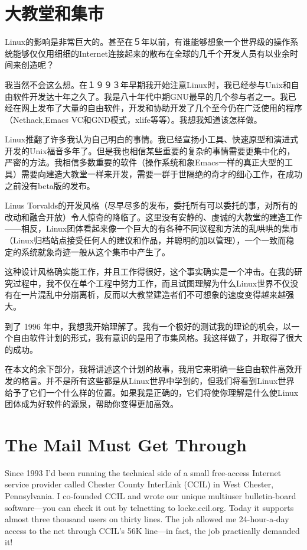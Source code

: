\documentclass[a4paper,12pt,UTF8,twoside]{ctexbook}
\begin{document}
\chapter{大教堂和集市}


Linux的影响是非常巨大的。甚至在５年以前，有谁能够想象一个世界级的操作系统能够仅仅用细细的Internet连接起来的散布在全球的几千个开发人员有以业余时间来创造呢？

我当然不会这么想。在１９９３年早期我开始注意Linux时，我已经参与Unix和自由软件开发达十年之久了。我是八十年代中期GNU最早的几个参与者之一。我已经在网上发布了大量的自由软件，开发和协助开发了几个至今仍在广泛使用的程序（Nethack,Emacs VC和GND模式，xlife等等）。我想我知道该怎样做。


Linux推翻了许多我认为自己明白的事情。我已经宣扬小工具、快速原型和演进式开发的Unix福音多年了。但是我也相信某些重要的复杂的事情需要更集中化的，严密的方法。我相信多数重要的软件（操作系统和象Emacs一样的真正大型的工具）需要向建造大教堂一样来开发，需要一群于世隔绝的奇才的细心工作，在成功之前没有beta版的发布。

Linus Torvalds的开发风格（尽早尽多的发布，委托所有可以委托的事，对所有的改动和融合开放）令人惊奇的降临了。这里没有安静的、虔诚的大教堂的建造工作——相反，Linux团体看起来像一个巨大的有各种不同议程和方法的乱哄哄的集市（Linux归档站点接受任何人的建议和作品，并聪明的加以管理），一个一致而稳定的系统就象奇迹一般从这个集市中产生了。


这种设计风格确实能工作，并且工作得很好，这个事实确实是一个冲击。在我的研究过程中，我不仅在单个工程中努力工作，而且试图理解为什么Linux世界不仅没有在一片混乱中分崩离析，反而以大教堂建造者们不可想象的速度变得越来越强大。


到了 1996 年中，我想我开始理解了。我有一个极好的测试我的理论的机会，以一个自由软件计划的形式，我有意识的是用了市集风格。我这样做了，并取得了很大的成功。


在本文的余下部分，我将讲述这个计划的故事，我用它来明确一些自由软件高效开发的格言。并不是所有这些都是从Linux世界中学到的，但我们将看到Linux世界给予了它们一个什么样的位置。如果我是正确的，它们将使你理解是什么使Linux团体成为好软件的源泉，帮助你变得更加高效。

\chapter{The Mail Must Get Through}

Since 1993 I'd been running the technical side of a small free-access Internet service provider called Chester County InterLink (CCIL) in West Chester, Pennsylvania. I co-founded CCIL and wrote our unique multiuser bulletin-board software—you can check it out by telnetting to locke.ccil.org. Today it supports almost three thousand users on thirty lines. The job allowed me 24-hour-a-day access to the net through CCIL's 56K line—in fact, the job practically demanded it!
\end{document}
